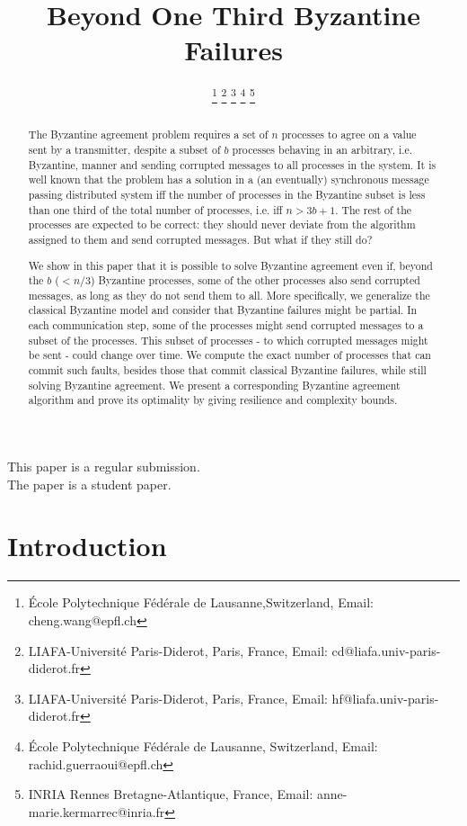 \documentclass[11pt,conference,compsoc,onecolumn,romanappendices]{IEEEtran}
\title{\LARGE Beyond One Third Byzantine Failures}
\author{
\IEEEauthorblockN{
Wang Cheng\IEEEauthorrefmark{1},\quad
Carole Delporte-Gallet\IEEEauthorrefmark{2},\quad
Hugues Fauconnier\IEEEauthorrefmark{3}\\[0.7em]
Rachid Guerraoui\IEEEauthorrefmark{4},\quad
Anne-Marie Kermarrec\IEEEauthorrefmark{5}}
\thanks{\IEEEauthorrefmark{1}\'{E}cole Polytechnique F\'{e}d\'{e}rale de Lausanne,Switzerland,
\; Email: cheng.wang@epfl.ch}
\thanks{\IEEEauthorrefmark{2}LIAFA-Universit\'{e} Paris-Diderot, Paris, France,
\; Email: cd@liafa.univ-paris-diderot.fr}
\thanks{\IEEEauthorrefmark{3}LIAFA-Universit\'{e} Paris-Diderot, Paris, France,
\; Email: hf@liafa.univ-paris-diderot.fr}
\thanks{\IEEEauthorrefmark{4}\'{E}cole Polytechnique F\'{e}d\'{e}rale de Lausanne, Switzerland,
\; Email: rachid.guerraoui@epfl.ch}
\thanks{\IEEEauthorrefmark{5}INRIA Rennes Bretagne-Atlantique, France,
\; Email: anne-marie.kermarrec@inria.fr}
}
\date{}
\begin{document}

\maketitle

\begin{abstract}

The Byzantine agreement problem requires a set of $n$ processes to agree on
a value sent by a transmitter, despite a subset of $b$ processes behaving in
an arbitrary, i.e. Byzantine, manner and sending corrupted messages to all
processes in the system. It is well known that the problem has a solution in a
(an eventually) synchronous message passing distributed system iff the number
of processes in the Byzantine subset is less than one third of the total
number of processes, i.e. iff $n > 3b+1$. The rest of the processes are
expected to be correct: they should never deviate from the algorithm assigned
to them and send corrupted messages. But what if they still do?

We show in this paper that it is possible to solve Byzantine agreement even
if, beyond the $ b$ ($< n/3 $) Byzantine processes, some of the other  processes
also send corrupted messages, as long as they do not send them to all.  More
specifically, we generalize the classical Byzantine model and consider that
Byzantine failures might be partial. In each communication step, some of the
processes might send corrupted messages to a subset of the processes. This
subset of processes - to which corrupted messages might be sent - could change
over time. We compute the exact number of processes that can commit such
faults, besides those that commit classical Byzantine failures, while still
solving Byzantine agreement. We present a corresponding Byzantine agreement
algorithm and prove its optimality by giving resilience and complexity
bounds.

\end{abstract}

\vspace{2cm}
\begin{center}
\Large This paper is a regular submission.\\
\Large The paper is a student paper.
\end{center}

\newpage
{}\setcounter{page}{1}

{\newpage}

\section{Introduction}
\end{document}
